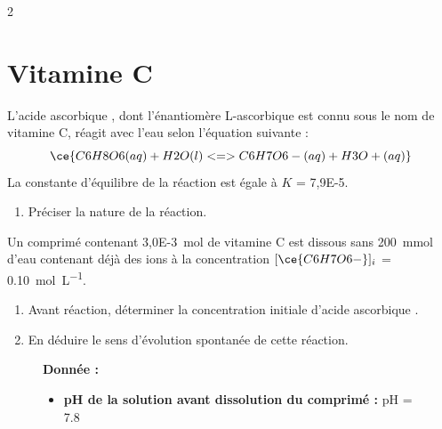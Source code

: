 \documentclass[a4paper,11pt,fleqn]{article}%
\begin{document}
\begin{multicols}{2}
\section{Vitamine C}
L'acide ascorbique , dont l'énantiomère L-ascorbique est connu sous le nom de vitamine C, réagit avec l'eau selon l'équation suivante :
$$\ce{C6H8O6(aq) + H2O(l) <=> C6H7O6-(aq) + H3O+(aq)}$$
La constante d'équilibre de la réaction est égale à $K$ = \num{7,9E-5}.

\begin{enumerate}
    \item Préciser la nature de la réaction.
\end{enumerate}
Un comprimé contenant \SI{3,0E-3}{\mole} de vitamine C est dissous sans \SI{200}{\milli\mole} d'eau contenant déjà des ions  à la concentration $[\ce{C6H7O6-}]_i$ = \SI{0,10}{\mole\per\liter}.
\begin{enumerate}[resume]
    \item Avant réaction, déterminer la concentration initiale d'acide ascorbique .
    \item En déduire le sens d'évolution spontanée de cette réaction.
\end{enumerate}
\begin{figure}[H]
    \begin{minipage}{\linewidth}
    \textbf{Donnée :}
    \begin{itemize}
        \item \textbf{pH de la solution avant dissolution du comprimé :} pH = \num{7,8}
    \end{itemize}
    \end{minipage}
\end{figure}


\end{multicols}
\end{document}
